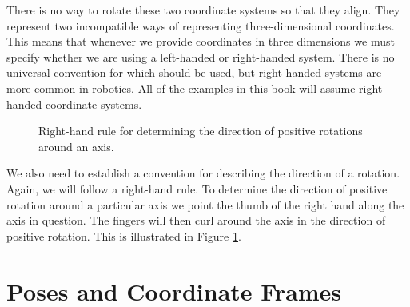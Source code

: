 There is no way to rotate these two coordinate systems so that they
align.  They represent two incompatible ways of representing
three-dimensional coordinates.  This means that whenever we provide
coordinates in three dimensions we must specify whether we are using a
left-handed or right-handed system.  There is no universal convention
for which should be used, but right-handed systems are more common in
robotics.  All of the examples in this book will assume right-handed
coordinate systems.

\begin{figure}
\begin{center}
\end{center}
\caption{Right-hand rule for determining the direction of positive
  rotations around an axis.}
\label{fig:right_hand_rotation}
\end{figure}


We also need to establish a convention for describing the direction of
a rotation.  Again, we will follow a right-hand rule.  To determine
the direction of positive rotation around a particular axis we point
the thumb of the right hand along the axis in question.  The fingers
will then curl around the axis in the direction of positive rotation.
This is illustrated in Figure \ref{fig:right_hand_rotation}.



\section{Poses and Coordinate Frames}

